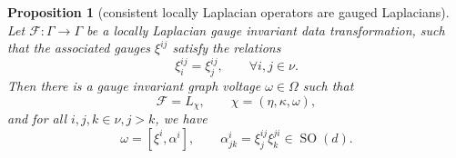 \documentclass[10pt,reqno]{amsart}
\numberwithin{equation}{section}
\theoremstyle{bfnote}
\newtheorem{proposition}[theorem]{Proposition}
\theoremstyle{bfdef}
\newcommand{\mc}[1]{\mathcal{#1}}
\DeclareMathOperator{\SO}{SO}
\begin{document}
	\begin{proposition}[consistent locally Laplacian operators are gauged Laplacians]\label{prop:loc-lpl}
		Let $\mc{F} : \Gamma \to \Gamma$ be a locally Laplacian gauge invariant data transformation, such that the associated gauges $\xi^{ij}$ satisfy the relations
		\begin{equation}\label{eq:intergrability}
			\xi^{ij}_{i} = \xi^{ij}_{j}, \qquad \forall i,j \in \nu.
		\end{equation}
		Then there is a gauge invariant graph voltage $\omega \in \Omega$ such that
		\begin{equation}\label{eq:mcF=Lchi}
			\mc{F} = L_{\chi}, \qquad \chi = (\eta,\kappa,\omega),
		\end{equation}
		and for all $i,j,k \in \nu, j > k$, we have
		\begin{equation}\label{eq:def-alphai}
			\omega = [\xi^{i},\alpha^{i}], \qquad
			\alpha^{i}_{jk} = \xi^{ij}_{j} \xi^{ji}_{k} \in \SO(d).
		\end{equation}
	\end{proposition}
\end{document}
